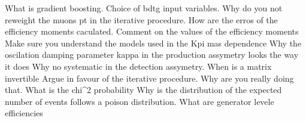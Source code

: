 
What is gradient boosting.
Choice of bdtg input variables.
Why do you not reweight the muons pt in the iterative procedure.
How are the erros of the efficiency moments caculated. 
Comment on the values of the efficiency moments
Make sure you understand the models used in the Kpi mas dependence
Why the oscilation damping parameter kappa in the production assymetry looks the way it does 
Why no systematic in the detection assymetry.
When is a matrix invertible
Argue in favour of the iterative procedure. Why are you really doing that.
What is the chi^2 probability
Why is the distribution of the expected number of events follows a poison distribution.
What are generator levele efficiencies

